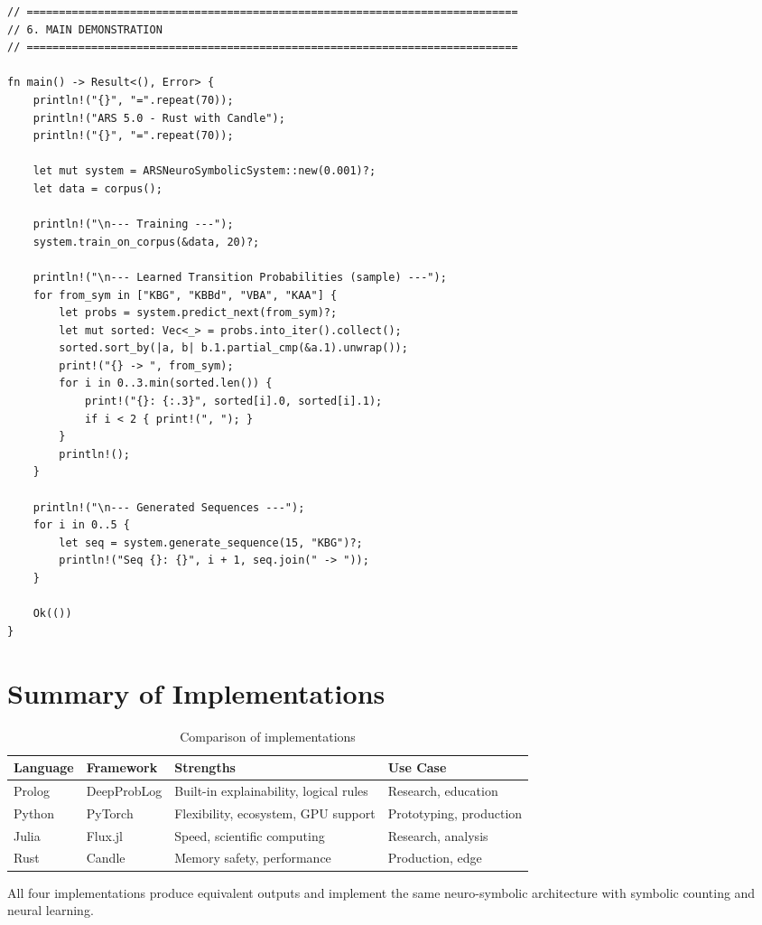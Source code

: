 \documentclass[10pt,a4paper]{article}
\begin{document}
\begin{lstlisting}[style=rust, caption=ars5_rust.rs]
// ============================================================================
// 6. MAIN DEMONSTRATION
// ============================================================================

fn main() -> Result<(), Error> {
    println!("{}", "=".repeat(70));
    println!("ARS 5.0 - Rust with Candle");
    println!("{}", "=".repeat(70));

    let mut system = ARSNeuroSymbolicSystem::new(0.001)?;
    let data = corpus();

    println!("\n--- Training ---");
    system.train_on_corpus(&data, 20)?;

    println!("\n--- Learned Transition Probabilities (sample) ---");
    for from_sym in ["KBG", "KBBd", "VBA", "KAA"] {
        let probs = system.predict_next(from_sym)?;
        let mut sorted: Vec<_> = probs.into_iter().collect();
        sorted.sort_by(|a, b| b.1.partial_cmp(&a.1).unwrap());
        print!("{} -> ", from_sym);
        for i in 0..3.min(sorted.len()) {
            print!("{}: {:.3}", sorted[i].0, sorted[i].1);
            if i < 2 { print!(", "); }
        }
        println!();
    }

    println!("\n--- Generated Sequences ---");
    for i in 0..5 {
        let seq = system.generate_sequence(15, "KBG")?;
        println!("Seq {}: {}", i + 1, seq.join(" -> "));
    }

    Ok(())
}
\end{lstlisting}

\section{Summary of Implementations}

\begin{table}[H]
\centering
\caption{Comparison of implementations}
\label{tab:comparison}
\begin{tabular}{@{} l l l l @{}}
\toprule
\textbf{Language} & \textbf{Framework} & \textbf{Strengths} & \textbf{Use Case} \\
\midrule
Prolog & DeepProbLog & Built-in explainability, logical rules & Research, education \\
Python & PyTorch & Flexibility, ecosystem, GPU support & Prototyping, production \\
Julia & Flux.jl & Speed, scientific computing & Research, analysis \\
Rust & Candle & Memory safety, performance & Production, edge \\
\bottomrule
\end{tabular}
\end{table}

All four implementations produce equivalent outputs and implement the same
neuro-symbolic architecture with symbolic counting and neural learning.
\end{document}
